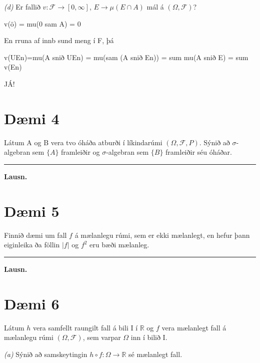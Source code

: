 \documentclass[]{book}
\begin{document}
\emph{(d)} Er fallið \(v:\mathcal F \rightarrow [0,\infty]\), \(E\rightarrow \mu(E\cap A)\) mál á \((\Omega, \mathcal F)\)?

v(ö) = mu(0 sam A) = 0

En rruna af innb sund meng í F, þá

v(UEn)=mu(A snið UEn) = mu(sam (A snið En)) = sum mu(A snið E) = sum v(En)

JÁ!

\hypertarget{dmi-4-3}{%
\section*{Dæmi 4}\label{dmi-4-3}}

Látum A og B vera tvo óháða atburði í líkindarúmi \((\Omega,\mathcal F, P)\). Sýnið að \(\sigma\)-algebran sem \(\{A\}\) framleiðir og \(\sigma\)-algebran sem \(\{B\}\) framleiðir séu óháðar.

\begin{center}\rule{0.5\linewidth}{\linethickness}\end{center}

\textbf{Lausn.}

\hypertarget{dmi-5-3}{%
\section*{Dæmi 5}\label{dmi-5-3}}

Finnið dæmi um fall \(f\) á mælanlegu rúmi, sem er ekki mælanlegt, en hefur þann eiginleika ða föllin \(|f|\) og \(f^2\) eru bæði mælanleg.

\begin{center}\rule{0.5\linewidth}{\linethickness}\end{center}

\textbf{Lausn.}

\hypertarget{dmi-6-3}{%
\section*{Dæmi 6}\label{dmi-6-3}}

Látum \(h\) vera samfellt raungilt fall á bili I í \(\mathbb R\) og \(f\) vera mælanlegt fall á mælanlegu rúmi \((\Omega, \mathcal F)\), sem varpar \(\Omega\) inn í bilið I.

\emph{(a)} Sýnið að samskeytingin \(h\circ f: \Omega \rightarrow \mathbb R\) sé mælanlegt fall.
\end{document}
